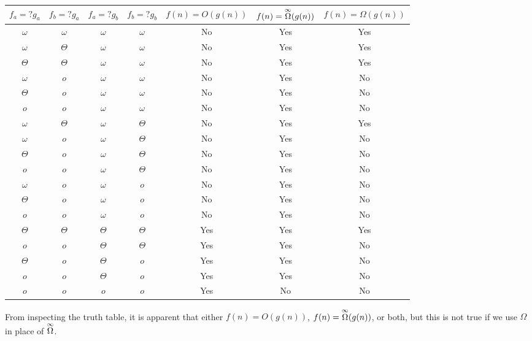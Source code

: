 \documentclass{article}
\begin{document}
\noindent\begin{tabular}{c c c c|c|c|c}
	$f_a = ?g_a$ & $f_b = ?g_a$ & $f_a = ?g_b$ & $f_b = ?g_b$ & $f(n) = O(g(n))$ & $f(n) = \overset{\small\infty}{\Omega}(g(n))$ & $f(n) = \Omega(g(n))$ \\ \hline
	{\color{Gray}$\omega$} & $\omega$ & {\color{Gray}$\omega$} & {\color{Gray}$\omega$} & {\color{Red}No} & {\color{Green}Yes} & {\color{Green}Yes} \\
	$\omega$ & $\Theta$ & {\color{Gray}$\omega$} & $\omega$ & {\color{Red}No} & {\color{Green}Yes} & {\color{Green}Yes} \\
	$\Theta$ & $\Theta$ & {\color{Gray}$\omega$} & $\omega$ & {\color{Red}No} & {\color{Green}Yes} & {\color{Green}Yes} \\
	$\omega$ & $o$ & {\color{Gray}$\omega$} & $\omega$ & {\color{Red}No} & {\color{Green}Yes} & {\color{Red}No} \\
	$\Theta$ & $o$ & {\color{Gray}$\omega$} & $\omega$ & {\color{Red}No} & {\color{Green}Yes} & {\color{Red}No} \\
	$o$ & {\color{Gray}$o$} & {\color{Gray}$\omega$} & $\omega$ & {\color{Red}No} & {\color{Green}Yes} & {\color{Red}No} \\
	$\omega$ & $\Theta$ & $\omega$ & $\Theta$ & {\color{Red}No} & {\color{Green}Yes} & {\color{Green}Yes} \\
	$\omega$ & $o$ & $\omega$ & $\Theta$ & {\color{Red}No} & {\color{Green}Yes} & {\color{Red}No} \\
	$\Theta$ & $o$ & $\omega$ & $\Theta$ & {\color{Red}No} & {\color{Green}Yes} & {\color{Red}No} \\
	$o$ & {\color{Gray}$o$} & $\omega$ & $\Theta$ & {\color{Red}No} & {\color{Green}Yes} & {\color{Red}No} \\
	$\omega$ & {\color{Gray}$o$} & $\omega$ & $o$ & {\color{Red}No} & {\color{Green}Yes} & {\color{Red}No} \\
	$\Theta$ & {\color{Gray}$o$} & $\omega$ & $o$ & {\color{Red}No} & {\color{Green}Yes} & {\color{Red}No} \\
	$o$ & {\color{Gray}$o$} & $\omega$ & $o$ & {\color{Red}No} & {\color{Green}Yes} & {\color{Red}No} \\
	$\Theta$ & $\Theta$ & $\Theta$ & $\Theta$ & {\color{Green}Yes} & {\color{Green}Yes} & {\color{Green}Yes} \\
	$o$ & {\color{Gray}$o$} & $\Theta$ & $\Theta$ & {\color{Green}Yes} & {\color{Green}Yes} & {\color{Red}No} \\
	$\Theta$ & {\color{Gray}$o$} & $\Theta$ & $o$ & {\color{Green}Yes} & {\color{Green}Yes} & {\color{Red}No} \\
	$o$ & {\color{Gray}$o$} & $\Theta$ & $o$ & {\color{Green}Yes} & {\color{Green}Yes} & {\color{Red}No} \\
	{\color{Gray}$o$} & {\color{Gray}$o$} & $o$ & {\color{Gray}$o$} & {\color{Green}Yes} & {\color{Red}No} & {\color{Red}No} \\
\end{tabular}
From inspecting the truth table, it is apparent that either $f(n) = O(g(n))$, $f(n) = \overset{\small\infty}{\Omega}(g(n))$, or both, but this is not true if we use $\Omega$ in place of $\overset{\small\infty}{\Omega}$.
\end{document}
